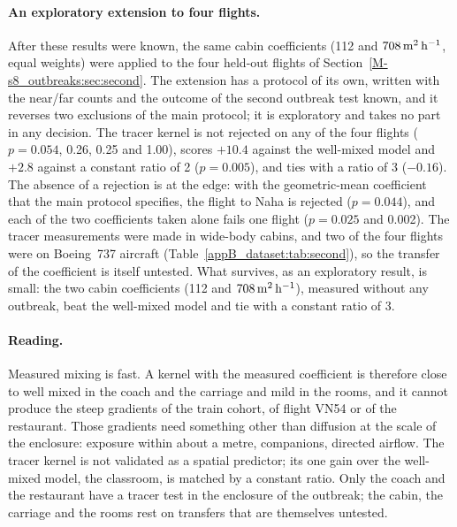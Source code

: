 \paragraph{An exploratory extension to four flights.}
After these results were known, the same cabin coefficients (112 and $708\,\mathrm{m}^2\,\mathrm{h}^{-1}$, equal weights) were applied
to the four held-out flights of Section~\ref{M-s8_outbreaks:sec:second}. The extension has a protocol of its
own, written with the near/far counts and the outcome of the second outbreak test known, and it reverses two
exclusions of the main protocol; it is exploratory and takes no part in any decision. The tracer kernel is not
rejected on any of the four flights ($p=0.054$, 0.26, 0.25 and 1.00), scores $+10.4$ against the well-mixed
model and $+2.8$ against a constant ratio of 2 ($p=0.005$), and ties with a ratio of 3 ($-0.16$). The absence
of a rejection is at the edge: with the geometric-mean coefficient that the main protocol specifies, the
flight to Naha is rejected ($p=0.044$), and each of the two coefficients taken alone fails one flight
($p=0.025$ and 0.002). The tracer measurements were made in wide-body cabins, and two of the four flights
were on Boeing~737 aircraft (Table~\ref{appB_dataset:tab:second}), so the transfer of the coefficient is
itself untested. What survives, as an exploratory result, is small: the two cabin coefficients (112 and
$708\,\mathrm{m}^2\,\mathrm{h}^{-1}$), measured without any outbreak, beat the well-mixed model and tie with a constant ratio of 3.

\paragraph{Reading.}
Measured mixing is fast. A kernel with the measured coefficient is therefore close to well mixed in the coach
and the carriage and mild in the rooms, and it cannot produce the steep gradients of the train cohort, of
flight VN54 or of the restaurant. Those gradients need something other than diffusion at the scale of the
enclosure: exposure within about a metre, companions, directed airflow. The tracer kernel is not validated as
a spatial predictor; its one gain over the well-mixed model, the classroom, is matched by a constant ratio.
Only the coach and the restaurant have a tracer test in the enclosure of the outbreak; the cabin, the carriage
and the rooms rest on transfers that are themselves untested.

